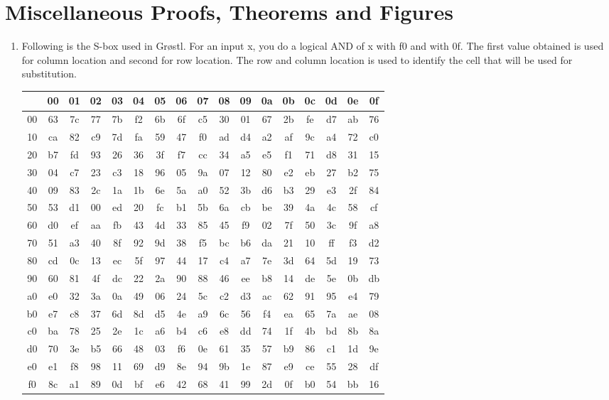 \chapter{Miscellaneous Proofs, Theorems and Figures}

\begin{enumerate}
\item Following is the S-box used in Gr{\o}stl. For an input x, you do a logical AND of x with 
  f0 and with 0f. The first value obtained is used for column location and second for row location.
  The row and column location is used to identify the cell that will be used for substitution.
  \begin{table}[h]
  \begin{center}
    \begin{tabular}{ c |  *{16}{c}}
       & 00 & 01 & 02 & 03 & 04 & 05 & 06 & 07 & 08 & 09 & 0a & 0b & 0c & 0d & 0e & 0f \\ \hline
    00 & 63 & 7c & 77 & 7b & f2 & 6b & 6f & c5 & 30 & 01 & 67 & 2b & fe & d7 & ab & 76 \\ 
    10 & ca & 82 & c9 & 7d & fa & 59 & 47 & f0 & ad & d4 & a2 & af & 9c & a4 & 72 & c0 \\
    20 & b7 & fd & 93 & 26 & 36 & 3f & f7 & cc & 34 & a5 & e5 & f1 & 71 & d8 & 31 & 15 \\
    30 & 04 & c7 & 23 & c3 & 18 & 96 & 05 & 9a & 07 & 12 & 80 & e2 & eb & 27 & b2 & 75 \\
    40 & 09 & 83 & 2c & 1a & 1b & 6e & 5a & a0 & 52 & 3b & d6 & b3 & 29 & e3 & 2f & 84 \\
    50 & 53 & d1 & 00 & ed & 20 & fc & b1 & 5b & 6a & cb & be & 39 & 4a & 4c & 58 & cf \\
    60 & d0 & ef & aa & fb & 43 & 4d & 33 & 85 & 45 & f9 & 02 & 7f & 50 & 3c & 9f & a8 \\
    70 & 51 & a3 & 40 & 8f & 92 & 9d & 38 & f5 & bc & b6 & da & 21 & 10 & ff & f3 & d2 \\
    80 & cd & 0c & 13 & ec & 5f & 97 & 44 & 17 & c4 & a7 & 7e & 3d & 64 & 5d & 19 & 73 \\
    90 & 60 & 81 & 4f & dc & 22 & 2a & 90 & 88 & 46 & ee & b8 & 14 & de & 5e & 0b & db \\
    a0 & e0 & 32 & 3a & 0a & 49 & 06 & 24 & 5c & c2 & d3 & ac & 62 & 91 & 95 & e4 & 79 \\
    b0 & e7 & c8 & 37 & 6d & 8d & d5 & 4e & a9 & 6c & 56 & f4 & ea & 65 & 7a & ae & 08 \\
    c0 & ba & 78 & 25 & 2e & 1c & a6 & b4 & c6 & e8 & dd & 74 & 1f & 4b & bd & 8b & 8a \\
    d0 & 70 & 3e & b5 & 66 & 48 & 03 & f6 & 0e & 61 & 35 & 57 & b9 & 86 & c1 & 1d & 9e \\
    e0 & e1 & f8 & 98 & 11 & 69 & d9 & 8e & 94 & 9b & 1e & 87 & e9 & ce & 55 & 28 & df \\
    f0 & 8c & a1 & 89 & 0d & bf & e6 & 42 & 68 & 41 & 99 & 2d & 0f & b0 & 54 & bb & 16 \\
    \end{tabular}
  \end{center}
  \end{table}


\end{enumerate}
